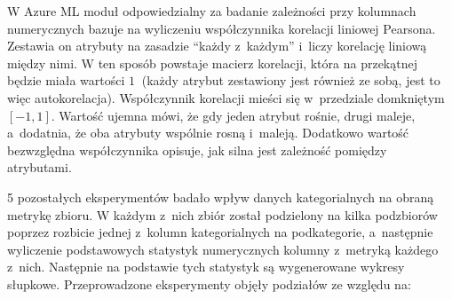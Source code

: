 W Azure ML moduł odpowiedzialny za badanie zależności przy kolumnach numerycznych bazuje na wyliczeniu współczynnika korelacji liniowej Pearsona.
Zestawia on atrybuty na zasadzie ``każdy z~każdym'' i~liczy korelację liniową między nimi.
W ten sposób powstaje macierz korelacji, która na przekątnej będzie miała wartości \( 1~\) (każdy atrybut zestawiony jest również ze sobą, jest to więc autokorelacja).
Współczynnik korelacji mieści się w~przedziale domkniętym \( [-1, 1] \).
Wartość ujemna mówi, że gdy jeden atrybut rośnie, drugi maleje, a~dodatnia, że oba atrybuty wspólnie rosną i~maleją.
Dodatkowo wartość bezwzględna współczynnika opisuje, jak silna jest zależność pomiędzy atrybutami.

5 pozostałych eksperymentów badało wpływ danych kategorialnych na obraną metrykę zbioru.
W każdym z~nich zbiór został podzielony na kilka podzbiorów poprzez rozbicie jednej z~kolumn kategorialnych na podkategorie, a~następnie wyliczenie podstawowych statystyk numerycznych kolumny z~metryką każdego z~nich.
Następnie na podstawie tych statystyk są wygenerowane wykresy słupkowe.
Przeprowadzone eksperymenty objęły podziałów ze względu na:

